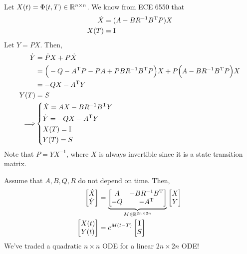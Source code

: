 Let $X(t)=\Phi(t,T)\in\mathbb{R}^{n\times n}$. We know from ECE 6550 that
\begin{align}
  \dot X &= (A-BR^{-1}B^\text{T} P) X \\
  X(T) &= \mathrm{I}
\end{align}
Let $Y=PX$. Then,
\begin{align}
  \dot Y &= \dot P X + P \dot X \\
         &= \Big( -Q - A^\text{T} P - PA + PBR^{-1}B^\text{T} P \Big) X + P \Big( A - BR^{-1}B^\text{T} P \Big) X \\
         &= -Q X - A^\text{T} Y \\
  Y(T) &= S \\
  \Longrightarrow &
  \begin{dcases}
    \dot X = AX - BR^{-1}B^\text{T} Y \\
    \dot Y = -QX - A^\text{T} Y \\
    X(T) = \mathrm{I} \\
    Y(T) = S
  \end{dcases}
\end{align}
Note that $P=YX^{-1}$, where $X$ is always invertible since it is a state transition matrix.

Assume that $A,B,Q,R$ do not depend on time. Then,
\begin{align}
  \begin{bmatrix}
    \dot X \\ \dot Y
  \end{bmatrix} &= \underbrace{ \begin{bmatrix}
    A & -BR^{-1}B^\text{T} \\ -Q & -A^\text{T}
  \end{bmatrix} }_{M\in\mathbb{R}^{2n\times 2n}} \begin{bmatrix}
    X \\ Y
  \end{bmatrix} \\
  \begin{bmatrix}
    X(t) \\ Y(t)
  \end{bmatrix} &= e^{M(t-T)} \begin{bmatrix}
    \mathrm{I} \\ S
  \end{bmatrix}
\end{align}
We've traded a quadratic $n\times n$ ODE for a linear $2n\times 2n$ ODE!

